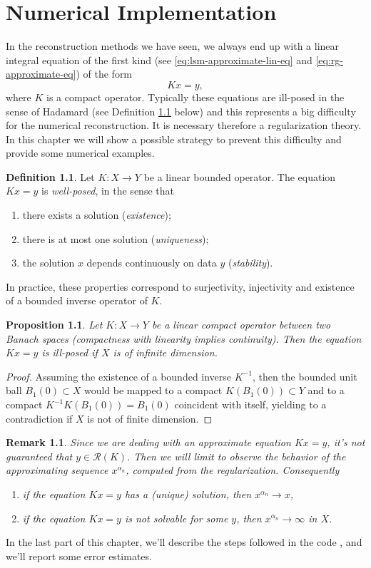 \documentclass[10pt, a4paper, twoside, openright]{book}
\theoremstyle{definition}
\newtheorem{definition}[subsection]{Definition}
\theoremstyle{plain}
\theoremstyle{plain}
\theoremstyle{plain}
\newtheorem{proposition}[subsection]{Proposition}
\theoremstyle{plain}
\newtheorem{remark}[subsection]{Remark}
\theoremstyle{plain}
\theoremstyle{plain}
\theoremstyle{plain}
\theoremstyle{plain}
\begin{document}
\chapter{Numerical Implementation}
\label{ch:implementation}
In the reconstruction methods we have seen, we always end up with a linear integral equation of the 
first kind (see \eqref{eq:lsm-approximate-lin-eq} and \eqref{eq:rg-approximate-eq}) of the form
\begin{equation}
 Kx = y,\label{eq:first-to-inv}
\end{equation}
where $K$ is a compact operator.
Typically these equations are ill-posed in the sense of Hadamard (see Definition \ref{def:well-posed-lineareq} below) 
and this represents a big difficulty for the numerical reconstruction. It is necessary therefore a regularization 
theory. In this chapter we will show a possible strategy to prevent this difficulty and provide some numerical examples.
\begin{definition}
\label{def:well-posed-lineareq}
 Let $K:X\to Y$ be a linear bounded operator. The equation $Kx=y$ is \emph{well-posed}, in the sense that
 \begin{enumerate}
  \item there exists a solution (\emph{existence});
  \item there is at most one solution (\emph{uniqueness});
  \item the solution $x$ depends continuously on data $y$ (\emph{stability}).
 \end{enumerate}
In practice, these properties correspond to surjectivity, injectivity and existence 
of a bounded inverse operator of $K$.
\end{definition}
\begin{proposition}
\label{prop:ill-posed}
 Let $K:X\to Y$ be a linear compact operator between two Banach spaces (compactness with linearity implies continuity). Then 
 the equation $Kx=y$ is ill-posed if $X$ is of infinite dimension.
\end{proposition}
\begin{proof}
 Assuming the existence of a bounded inverse $K^{-1}$, then the bounded unit ball $B_1(0)\subset X$ would be mapped to 
 a compact $K(B_1(0))\subset Y$ and to a compact $K^{-1}K(B_1(0))=B_1(0)$ coincident with itself, yielding to a contradiction if $X$ is not of finite dimension.
\end{proof}     
\begin{remark}
 Since we are dealing with an approximate equation $Kx=y$, it's not guaranteed that $y\in \mathcal{R}(K)$. 
 Then we will limit to observe the behavior of the approximating sequence $x^{\alpha_n}$, computed from the regularization.
 Consequently
 \begin{enumerate}
  \item if the equation $Kx=y$ has a (unique) solution, then $x^{\alpha_n}\to x$,
  \item if the equation $Kx=y$ is not solvable for some $y$, then $x^{\alpha_n}\to \infty$ in $X$.
 \end{enumerate}
\end{remark}
In the last part of this chapter, we'll describe the steps followed in the code \cite{}, and we'll report some error estimates.
\end{document}

